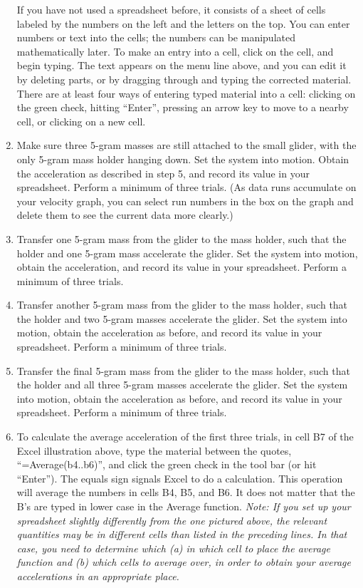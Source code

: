\begin{enumerate}[label=\arabic*.]
If you have not used a spreadsheet before, it consists of a sheet of cells labeled by the numbers on the left and the letters on the top.  You can enter numbers or text into the cells; the numbers can be manipulated mathematically later.  To make an entry into a cell, click on the cell, and begin typing.  The text appears on the menu line above, and you can edit it by deleting parts, or by dragging through and typing the corrected material.  There are at least four ways of entering typed material into a cell: clicking on the green check, hitting ``Enter'', pressing an arrow key to move to a nearby cell, or clicking on a new cell.

\item 
Make sure three 5-gram masses are still attached to the small glider, with the only 5-gram mass holder hanging down.
Set the system into motion.  Obtain the acceleration as described in step 5, and record its value in your spreadsheet.  Perform a minimum of three trials.  (As data runs accumulate on your velocity graph, you can select run numbers in the box on the graph and delete them to see the current data more clearly.)

\item Transfer one 5-gram mass from the glider to the mass holder, such that the holder and one 5-gram mass accelerate the glider.  Set the system into motion, obtain the acceleration, and record its value in your spreadsheet.  Perform a minimum of three trials.

\item Transfer another 5-gram mass from the glider to the mass holder, such that the holder and two 5-gram masses accelerate the glider.  Set the system into motion, obtain the acceleration as before, and record its value in your spreadsheet.  Perform a minimum of three trials.

\item Transfer the final 5-gram mass from the glider to the mass holder, such that the holder and all three 5-gram masses accelerate the glider.  Set the system into motion, obtain the acceleration as before, and record its value in your spreadsheet.  Perform a minimum of three trials.

\item To calculate the average acceleration of the first three trials, in cell B7 of the Excel illustration above, type the material between the quotes, ``=Average(b4..b6)'', and click the green check in the tool bar (or hit ``Enter'').  The equals sign signals Excel to do a calculation.  This operation will average the numbers in cells B4, B5, and B6.  It does not matter that the B's are typed in lower case in the Average function.
\emph{Note:  If you set up your spreadsheet slightly differently from the one
	pictured above, the relevant quantities may be in different cells than
	listed in the preceding lines.  In that case, you need to determine which
	(a) in which cell to place the average function and (b) which cells to
	average over, in order to obtain your average accelerations in an
appropriate place.}


\end{enumerate}
